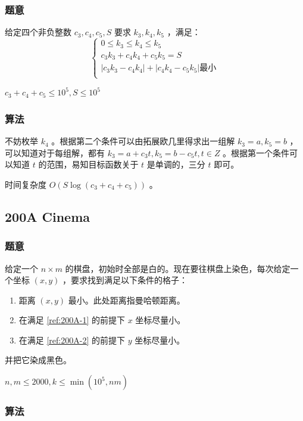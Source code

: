 \documentclass[11pt]{article}
\begin{document}
\subsubsection{题意}
\label{sec-11-4-1}

    给定四个非负整数 $c_3, c_4, c_5, S$ 要求 $k_3, k_4, k_5$ ，满足：
    \[
    \begin{cases}
    0 \leq k_3 \leq k_4 \leq k_5 \\
    c_3 k_3 + c_4 k_4 + c_5 k_5 = S \\
    |c_3 k_3 - c_4 k_4| +|c_4 k_4 - c_5 k_5| \text{最小} \\
    \end{cases}
    \]

    $c_3 + c_4 + c_5 \leq 10^5, S \leq 10^5$
\subsubsection{算法}
\label{sec-11-4-2}

    不妨枚举 $k_4$ 。根据第二个条件可以由拓展欧几里得求出一组解 $k_3 = a, k_5 = b$ ，可以知道对于每组解，都有 $k_3 = a + c_3 t, k_5 = b - c_5 t, t \in Z$ 。根据第一个条件可以知道 $t$ 的范围，易知目标函数关于 $t$ 是单调的，三分 $t$ 即可。

    时间复杂度 $O(S \log (c_3 + c_4 +c_5))$ 。
 
\subsection{200A  Cinema}
\label{sec-11-5}
\subsubsection{题意}
\label{sec-11-5-1}

    给定一个 $n \times m$ 的棋盘，初始时全部是白的。现在要往棋盘上染色，每次给定一个坐标 $(x, y)$ ，要求找到满足以下条件的格子：
\begin{enumerate}
\item \label{ref:200A-1} 距离 $(x, y)$ 最小。此处距离指曼哈顿距离。
\item \label{ref:200A-2} 在满足 \ref{ref:200A-1} 的前提下 $x$ 坐标尽量小。
\item 在满足 \ref{ref:200A-2} 的前提下 $y$ 坐标尽量小。
\end{enumerate}
    并把它染成黑色。

    $n, m \leq 2000, k \leq \min(10^5, nm)$
\subsubsection{算法}
\label{sec-11-5-2}
\end{document}

